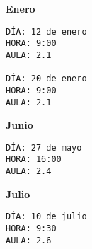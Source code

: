 \documentclass[11pt,a4paper]{article}
\begin{document}
{\bf Enero}
\begin{verbatim}
DÍA: 12 de enero
HORA: 9:00
AULA: 2.1

DÍA: 20 de enero
HORA: 9:00
AULA: 2.1
\end{verbatim}

{\bf Junio}
\begin{verbatim}
DÍA: 27 de mayo
HORA: 16:00
AULA: 2.4
\end{verbatim}

{\bf Julio}
\begin{verbatim}
DÍA: 10 de julio
HORA: 9:30
AULA: 2.6
\end{verbatim}
%

\begin{thebibliography}{99}

%


\end{thebibliography}
\end{document}
